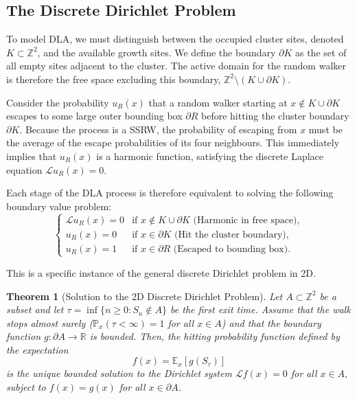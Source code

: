 \documentclass[12pt, a4paper, oneside]{report}
\newtheorem{theorem}{Theorem}[chapter]
\theoremstyle{remark}
\begin{document}
\subsection{The Discrete Dirichlet Problem}
\label{sec:dirichlet}

To model DLA, we must distinguish between the occupied cluster sites, denoted $K \subset \mathbb{Z}^2$, and the available growth sites. We define the boundary $\partial K$ as the set of all empty sites adjacent to the cluster. The active domain for the random walker is therefore the free space excluding this boundary, $\mathbb{Z}^2 \setminus (K \cup \partial K)$.

Consider the probability $u_R(x)$ that a random walker starting at $x \notin K \cup \partial K$ escapes to some large outer bounding box $\partial R$ before hitting the cluster boundary $\partial K$. Because the process is a SSRW, the probability of escaping from $x$ must be the average of the escape probabilities of its four neighbours. 
This immediately implies that $u_R(x)$ is a harmonic function, satisfying the discrete Laplace equation $\mathcal{L}u_R(x) = 0$. 

Each stage of the DLA process is therefore equivalent to solving the following boundary value problem:
\begin{equation*}
    \begin{cases}
      \mathcal{L} u_R(x) = 0 & \text{if } x \notin K \cup \partial K \text{ (Harmonic in free space)}, \\
      u_R(x) = 0 & \text{if } x \in \partial K \text{ (Hit the cluster boundary)}, \\
      u_R(x) = 1 & \text{if } x \in \partial R \text{ (Escaped to bounding box)}.
    \end{cases}
\end{equation*}

This is a specific instance of the general discrete Dirichlet problem in 2D. 

\begin{theorem}[Solution to the 2D Discrete Dirichlet Problem]
\label{thm:dirichlet_sol}
Let $A \subset \mathbb{Z}^2$ be a subset and let $\tau = \inf \{n \ge 0 : S_n \notin A\}$ be the first exit time. 
Assume that the walk stops almost surely ($\mathbb{P}_x(\tau < \infty) = 1$ for all $x \in A$) and that the boundary function $g: \partial A \to \mathbb{R}$ is bounded. Then, the hitting probability function defined by the expectation
\begin{equation}
    f(x) = \mathbb{E}_x [g(S_{\tau})]
    \label{eq:prob_solution}
\end{equation}
is the unique bounded solution to the Dirichlet system $\mathcal{L} f(x) = 0$ for all $x \in A$, subject to $f(x) = g(x)$ for all $x \in \partial A$.
\end{theorem}
\end{document}
